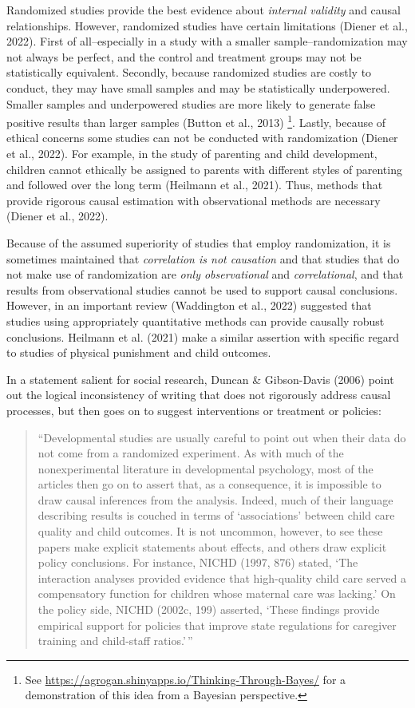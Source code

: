 \documentclass[
  letterpaper,
  DIV=11,
  numbers=noendperiod]{scrreprt}
\begin{document}
Randomized studies provide the best evidence about \emph{internal
validity} and causal relationships. However, randomized studies have
certain limitations (Diener et al., 2022). First of all--especially in a
study with a smaller sample--randomization may not always be perfect,
and the control and treatment groups may not be statistically
equivalent. Secondly, because randomized studies are costly to conduct,
they may have small samples and may be statistically underpowered.
Smaller samples and underpowered studies are more likely to generate
false positive results than larger samples (Button et al., 2013)
\footnote{See \url{https://agrogan.shinyapps.io/Thinking-Through-Bayes/}
  for a demonstration of this idea from a Bayesian perspective.}.
Lastly, because of ethical concerns some studies can not be conducted
with randomization (Diener et al., 2022). For example, in the study of
parenting and child development, children cannot ethically be assigned
to parents with different styles of parenting and followed over the long
term (Heilmann et al., 2021). Thus, methods that provide rigorous causal
estimation with observational methods are necessary (Diener et al.,
2022).

Because of the assumed superiority of studies that employ randomization,
it is sometimes maintained that \emph{correlation is not causation} and
that studies that do not make use of randomization are \emph{only
observational} and \emph{correlational}, and that results from
observational studies cannot be used to support causal conclusions.
However, in an important review (Waddington et al., 2022) suggested that
studies using appropriately quantitative methods can provide causally
robust conclusions. Heilmann et al. (2021) make a similar assertion with
specific regard to studies of physical punishment and child outcomes.

In a statement salient for social research, Duncan \& Gibson-Davis
(2006) point out the logical inconsistency of writing that does not
rigorously address causal processes, but then goes on to suggest
interventions or treatment or policies:

\begin{quote}
``Developmental studies are usually careful to point out when their data
do not come from a randomized experiment. As with much of the
nonexperimental literature in developmental psychology, most of the
articles then go on to assert that, as a consequence, it is impossible
to draw causal inferences from the analysis. Indeed, much of their
language describing results is couched in terms of `associations'
between child care quality and child outcomes. It is not uncommon,
however, to see these papers make explicit statements about effects, and
others draw explicit policy conclusions. For instance, NICHD (1997, 876)
stated, `The interaction analyses provided evidence that high-quality
child care served a compensatory function for children whose maternal
care was lacking.' On the policy side, NICHD (2002c, 199) asserted,
`These findings provide empirical support for policies that improve
state regulations for caregiver training and child-staff ratios.'\,''
\end{quote}
\end{document}
